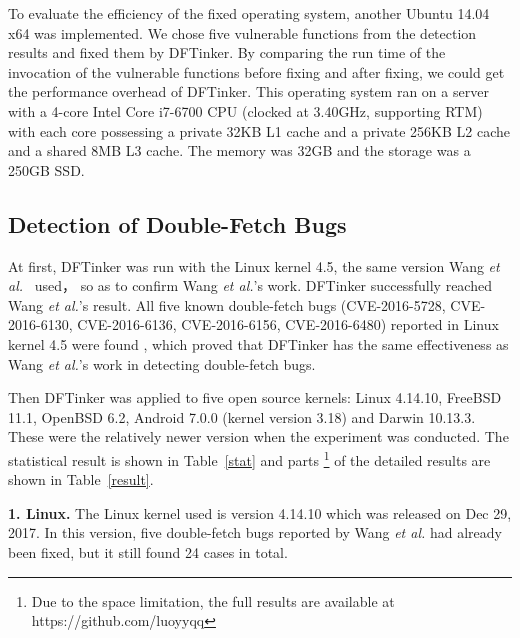 \documentclass[10pt]{llncs}
\begin{document}
To evaluate the efficiency of the fixed operating system, another Ubuntu 14.04 x64 was implemented. We chose five vulnerable functions from the detection results and fixed them by DFTinker. By comparing the run time of the invocation of the vulnerable functions before fixing and after fixing, we could get the performance overhead of DFTinker. This operating system ran on a server with a 4-core Intel Core i7-6700 CPU (clocked at 3.40GHz, supporting RTM) with each core possessing a private 32KB L1 cache and a private 256KB L2 cache and a shared 8MB L3 cache. The memory was 32GB and the storage was a 250GB SSD.
\subsection{Detection of Double-Fetch Bugs}
\label{evalue1}


At first, DFTinker was run with the Linux kernel 4.5, the same version Wang \textit{et al.}~\cite{wang}
used， so as to confirm Wang \textit{et al.}'s work. DFTinker successfully reached Wang \textit{et al.}'s result. All five known double-fetch bugs (CVE-2016-5728, CVE-2016-6130, CVE-2016-6136, CVE-2016-6156, CVE-2016-6480)
reported in Linux kernel 4.5 were found , which proved that DFTinker has the same effectiveness as Wang
\textit{et al.}'s work in detecting double-fetch bugs.


Then DFTinker was applied to five open source kernels: Linux 4.14.10, FreeBSD 11.1, OpenBSD 6.2, Android 7.0.0 (kernel version 3.18) and Darwin 10.13.3. These were the relatively newer version when the experiment was conducted. The statistical result is shown in Table~\ref{stat} and parts
\footnote{Due to the space limitation, the full results are available at https://github.com/luoyyqq}​ of the detailed results are shown in Table~\ref{result}.

\textbf{1. Linux.} The Linux kernel used is version 4.14.10 which was released on Dec 29, 2017. In this version, five double-fetch bugs reported by Wang \textit{et al.} had already been fixed, but it still found 24 cases in total.
\end{document}
